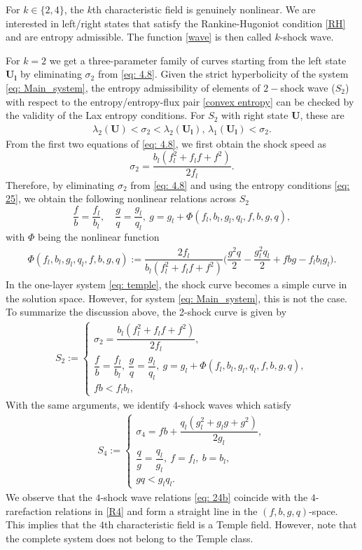 \documentclass[11pt]{article}
\numberwithin{equation}{section}
\newtheorem{counter example}[theorem]{Counter Example}
\begin{document}
{For $k\in \{2,4\}$, the $k$th characteristic field is genuinely nonlinear. We are interested in left/right states that satisfy the  Rankine-Hugoniot condition \eqref{RH} and are entropy admissible. The function \eqref{wave} is then called $k$-shock wave.

For $k=2$ we get a three-parameter family of curves starting from the left state $\mathbf{U_l}$ by eliminating $\sigma_2$ from \eqref{eq: 4.8}. Given the strict hyperbolicity of the system \eqref{eq: Main_system}, the entropy admissibility of elements of $2-$shock wave ($S_2$) with respect to the entropy/entropy-flux pair \eqref{convex entropy} can be checked by the validity of the Lax entropy conditions. For $S_2$ with right state $\mathbf{U}$, these are
\begin{align}\label{eq: 25}
    \lambda_2(\mathbf{U})<\sigma_2<\lambda_2(\mathbf{U_l}),\,
 \lambda_1(\mathbf{U_l})  < \sigma_2.
\end{align}
From the first two equations of \eqref{eq: 4.8}, we first obtain the shock speed as 
\[\sigma_2=\dfrac{b_l(f_l^2+f_lf+f^2)}{2f_l}.\]
Therefore, by eliminating $\sigma_2$ from  \eqref{eq: 4.8} and using the entropy conditions \eqref{eq: 25}, we obtain the following nonlinear relations across $S_2$
\[\dfrac{f}{b}=\dfrac{f_l}{b_l}, \quad \dfrac{g}{q}=\dfrac{g_l}{q_l}, ~g=g_l+\Phi(f_l, b_l, g_l, q_l, f, b, g, q),\]
with $\Phi$ being the  nonlinear function
\begin{align*}
   \Phi(f_l, b_l, g_l, q_l, f, b, g, q):= \dfrac{2f_l}{b_l(f_l^2+f_lf+f^2)}\bigg(\dfrac{g^2 q}{2}-\dfrac{g_l^2q_l}{2}+fb g-f_lb_lg_l\bigg).
\end{align*}
In the one-layer system \eqref{eq: temple}, the shock curve becomes a simple curve in the solution space. However, for system \eqref{eq: Main_system}, this is not the case. To summarize the discussion above, the 2-shock curve is given by 
\begin{align}\label{S_2def}
   S_2:=\begin{cases} \sigma_2= \dfrac{b_l(f_l^2+f_lf+f^2)}{2f_l},\\ 
   \dfrac{f}{b}=\dfrac{f_l}{b_l}, ~\dfrac{g}{q}=\dfrac{g_l}{q_l},~g=g_l+\Phi(f_l, b_l, g_l, q_l, f, b, g, q),
   \\
   fb<f_lb_l,\end{cases}
\end{align}
With the same arguments, we identify $4$-shock waves which satisfy
\begin{align}\label{eq: 24b}
   S_4:=\begin{cases} \sigma_4= fb+\dfrac{q_l(g_l^2+g_lg+g^2)}{2g_l},\\ 
   \dfrac{q}{g}=\dfrac{q_l}{g_l},~f=f_l,~b=b_l,\\
   gq<g_lq_l.
   \end{cases}
\end{align}
We observe that the $4$-shock wave relations \eqref{eq: 24b} coincide with the  $4$-rarefaction relations in \eqref{R4} and form a straight line in the $(f, b, g, q)$-space. This implies that the $4$th characteristic field is a Temple field. However, note that the complete system does not belong to the  Temple class.
}
\end{document}
